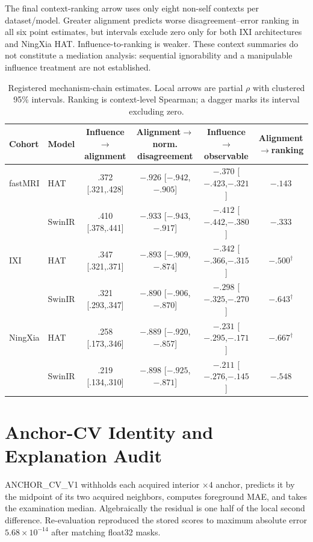 \documentclass[10pt,twocolumn,letterpaper]{article}
\begin{document}
The final context-ranking arrow uses only eight non-self contexts per dataset/model. Greater alignment predicts worse disagreement--error ranking in all six point estimates, but intervals exclude zero only for both IXI architectures and NingXia HAT. Influence-to-ranking is weaker. These context summaries do not constitute a mediation analysis: sequential ignorability and a manipulable influence treatment are not established.

\begin{table}[t]
\centering
\caption{Registered mechanism-chain estimates. Local arrows are partial $\rho$ with clustered 95\% intervals. Ranking is context-level Spearman; a dagger marks its interval excluding zero.}
\label{tab:s_chain}
\scriptsize
\setlength{\tabcolsep}{2.8pt}
\begin{tabular}{llcccc}
\toprule
Cohort&Model&Influence$\to$alignment&Alignment$\to$norm. disagreement&Influence$\to$observable&Alignment$\to$ranking\\
\midrule
fastMRI&HAT&.372 [.321,.428]&$-.926$ [$-.942$,$-.905$]&$-.370$ [$-.423$,$-.321$]&$-.143$\\
&SwinIR&.410 [.378,.441]&$-.933$ [$-.943$,$-.917$]&$-.412$ [$-.442$,$-.380$]&$-.333$\\
IXI&HAT&.347 [.321,.371]&$-.893$ [$-.909$,$-.874$]&$-.342$ [$-.366$,$-.315$]&$-.500^\dagger$\\
&SwinIR&.321 [.293,.347]&$-.890$ [$-.906$,$-.870$]&$-.298$ [$-.325$,$-.270$]&$-.643^\dagger$\\
NingXia&HAT&.258 [.173,.346]&$-.889$ [$-.920$,$-.857$]&$-.231$ [$-.295$,$-.171$]&$-.667^\dagger$\\
&SwinIR&.219 [.134,.310]&$-.898$ [$-.925$,$-.871$]&$-.211$ [$-.276$,$-.145$]&$-.548$\\
\bottomrule
\end{tabular}
\end{table}

\section{Anchor-CV Identity and Explanation Audit}
ANCHOR\_CV\_V1 withholds each acquired interior $\times4$ anchor, predicts it by the midpoint of its two acquired neighbors, computes foreground MAE, and takes the examination median. Algebraically the residual is one half of the local second difference. Re-evaluation reproduced the stored scores to maximum absolute error $5.68\times10^{-14}$ after matching float32 masks.
\end{document}
